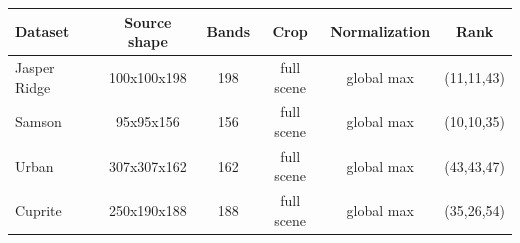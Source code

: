 \begin{tabular}{l c c c c c}
    \toprule
    Dataset & Source shape & Bands & Crop & Normalization & Rank \\
    \midrule
    Jasper Ridge & 100x100x198 & 198 & full scene & global max & (11,11,43) \\
    Samson & 95x95x156 & 156 & full scene & global max & (10,10,35) \\
    Urban & 307x307x162 & 162 & full scene & global max & (43,43,47) \\
    Cuprite & 250x190x188 & 188 & full scene & global max & (35,26,54) \\
    \bottomrule
\end{tabular}
